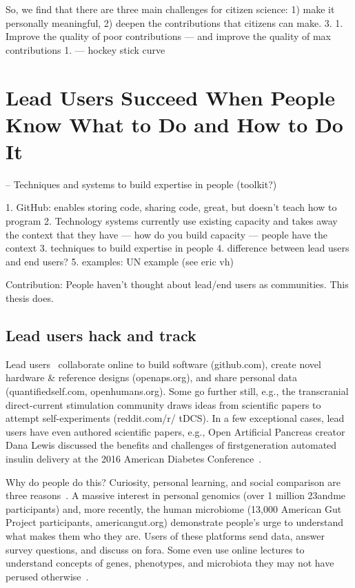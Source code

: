 So, we find that there are three main challenges for citizen science: 1) make it personally meaningful, 2) deepen the contributions that citizens can make.
3. 1. Improve the quality of poor contributions — and improve the quality of max contributions 
    1. — hockey stick curve 



\section{Lead Users Succeed When People Know What to Do and How to Do It}
-- Techniques and systems to build expertise in people (toolkit?)

1. GitHub: enables storing code, sharing code, great, but doesn’t teach how to program
2. Technology systems currently use existing capacity and takes away the context that they have — how do you build capacity — people have the context 
3. techniques to build expertise in people
4. difference between lead users and end users? 
5. examples: UN example (see eric vh)

Contribution: People haven't thought about lead/end users as communities. This thesis does.
\subsection{Lead users hack and track}
Lead users~\cite{VonHippel2005} collaborate online to build software
(github.com), create novel hardware \& reference designs
(openaps.org), and share personal data (quantifiedself.com,
openhumans.org). Some go further still, e.g., the transcranial
direct-current stimulation community draws ideas from scientific
papers to attempt self-experiments (reddit.com/r/
tDCS). In a few exceptional cases, lead users have even authored
scientific papers, e.g., Open Artificial Pancreas creator
Dana Lewis discussed the benefits and challenges of firstgeneration
automated insulin delivery at the 2016 American
Diabetes Conference~\cite{DanaLewis}.

Why do people do this? Curiosity, personal learning, and social
comparison are three reasons~\cite{Reinecke2015}. A massive interest in
personal genomics (over 1 million 23andme participants)
and, more recently, the human microbiome (13,000 American
Gut Project participants, americangut.org) demonstrate
people’s urge to understand what makes them who they are.
Users of these platforms send data, answer survey questions,
and discuss on fora. Some even use online lectures to understand
concepts of genes, phenotypes, and microbiota they
may not have perused otherwise~\cite{23andMe2017, Knight2016}.

